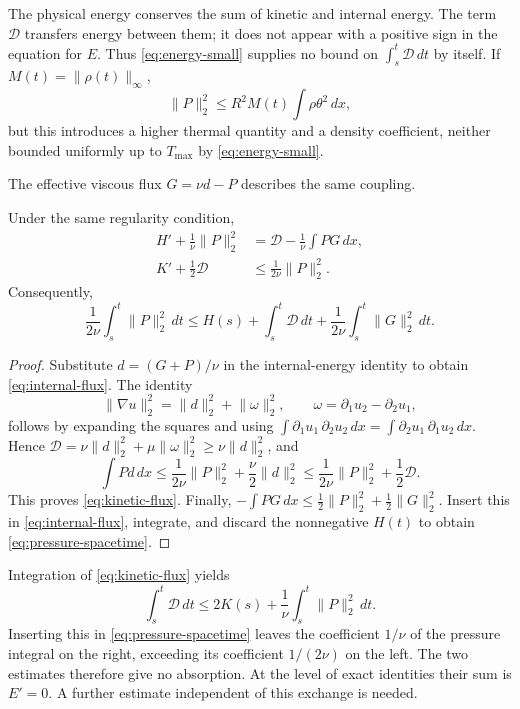 \documentclass[10pt,twoside]{article}
\newcommand{\dd}{\,dx}
\newcommand{\dt}{\,dt}
\newcommand{\norm}[2]{\lVert#1\rVert_{#2}}
\begin{document}
The physical energy conserves the sum of kinetic and internal energy.
The term $\mathcal D$ transfers energy between them; it does not
appear with a positive sign in the equation for $E$.
Thus \eqref{eq:energy-small} supplies no bound on
$\int_s^t\mathcal D\dt$ by itself. If $M(t)=\norm{\rho(t)}{\infty}$,
\begin{equation}\label{eq:pressure-thermal}
 \norm{P}{2}^2\le R^2M(t)\int\rho\theta^2\dd,
\end{equation}
but this introduces a higher thermal quantity and a density coefficient,
neither bounded uniformly up to $T_{\max}$ by \eqref{eq:energy-small}.

The effective viscous flux $G=\nu d-P$ describes the same coupling.

\begin{proposition}\label{prop:pressure-feedback}
Under the same regularity condition,
\begin{align}
 H'+\frac1\nu\norm{P}{2}^2
     &=\mathcal D-\frac1\nu\int PG\dd,\label{eq:internal-flux}\\
 K'+\frac12\mathcal D
     &\le\frac1{2\nu}\norm{P}{2}^2.\label{eq:kinetic-flux}
\end{align}
Consequently,
\begin{equation}\label{eq:pressure-spacetime}
 \frac1{2\nu}\int_s^t\norm{P}{2}^2\dt
 \le H(s)+\int_s^t\mathcal D\dt
                 +\frac1{2\nu}\int_s^t\norm{G}{2}^2\dt.
\end{equation}
\end{proposition}
\begin{proof}
Substitute $d=(G+P)/\nu$ in the internal-energy identity to obtain
\eqref{eq:internal-flux}. The identity
\[
 \norm{\nabla u}{2}^2=\norm{d}{2}^2+\norm{\omega}{2}^2,\qquad
 \omega=\partial_1u_2-\partial_2u_1,
\]
follows by expanding the squares and using
$\int\partial_1u_1\,\partial_2u_2\dd
 =\int\partial_2u_1\,\partial_1u_2\dd$.
Hence $\mathcal D=\nu\norm{d}{2}^2+\mu\norm{\omega}{2}^2
\ge\nu\norm{d}{2}^2$, and
\[
 \int Pd\dd\le\frac1{2\nu}\norm{P}{2}^2+\frac{\nu}{2}\norm{d}{2}^2
 \le\frac1{2\nu}\norm{P}{2}^2+\frac12\mathcal D.
\]
This proves \eqref{eq:kinetic-flux}. Finally,
$-\int PG\dd\le\frac12\norm{P}{2}^2+\frac12\norm{G}{2}^2$.
Insert this in \eqref{eq:internal-flux}, integrate, and discard the
nonnegative $H(t)$ to obtain \eqref{eq:pressure-spacetime}.
\end{proof}

Integration of \eqref{eq:kinetic-flux} yields
\[
 \int_s^t\mathcal D\dt
 \le2K(s)+\frac1\nu\int_s^t\norm{P}{2}^2\dt.
\]
Inserting this in \eqref{eq:pressure-spacetime} leaves the coefficient
$1/\nu$ of the pressure integral on the right, exceeding its coefficient
$1/(2\nu)$ on the left. The two estimates therefore give no absorption.
At the level of exact identities their sum is $E'=0$.
A further estimate independent of this exchange is needed.
\end{document}
